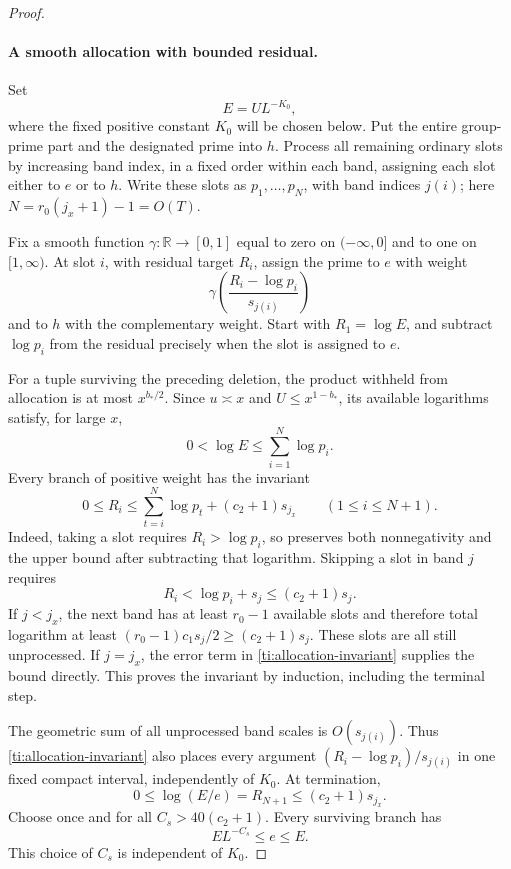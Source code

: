 \begin{proof}
\paragraph{A smooth allocation with bounded residual.}
Set
\begin{equation}\label{ti:E}
                            E=UL^{-K_0},
\end{equation}
where the fixed positive constant $K_0$ will be chosen below. Put the
entire group-prime part and the designated prime into $h$. Process all
remaining ordinary slots by increasing band index, in a fixed order
within each band, assigning each slot either to $e$ or to $h$.
Write these slots as $p_1,\ldots,p_N$, with band indices $j(i)$;
here $N=r_0(j_x+1)-1=O(T)$.

Fix a smooth function $\gamma:\mathbb R\to[0,1]$ equal to zero on
$(-\infty,0]$ and to one on $[1,\infty)$. At slot $i$, with residual
target $R_i$, assign the prime to $e$ with weight
\[
        \gamma\left(\frac{R_i-\log p_i}{s_{j(i)}}\right)
\]
and to $h$ with the complementary weight. Start with
$R_1=\log E$, and subtract $\log p_i$ from the residual precisely
when the slot is assigned to $e$.

For a tuple surviving the preceding deletion, the product withheld
from allocation is at most $x^{b_*/2}$. Since $u\asymp x$ and
$U\le x^{1-b_*}$, its available logarithms satisfy, for large $x$,
\[
 0<\log E\le\sum_{i=1}^N\log p_i.
\]
Every branch of positive weight has the invariant
\begin{equation}\label{ti:allocation-invariant}
 0\le R_i\le\sum_{t=i}^N\log p_t+(c_2+1)s_{j_x}
                    \qquad(1\le i\le N+1).
\end{equation}
Indeed, taking a slot requires $R_i>\log p_i$, so preserves both
nonnegativity and the upper bound after subtracting that logarithm.
Skipping a slot in band $j$ requires
\[
                  R_i<\log p_i+s_j\le(c_2+1)s_j.
\]
If $j<j_x$, the next band has at least $r_0-1$ available slots and
therefore total logarithm at least
$(r_0-1)c_1s_j/2\ge(c_2+1)s_j$. These slots are all still
unprocessed. If $j=j_x$, the error term in
\eqref{ti:allocation-invariant} supplies the bound directly.
This proves the invariant by induction, including the terminal step.

The geometric sum of all unprocessed band scales is
$O(s_{j(i)})$. Thus \eqref{ti:allocation-invariant} also places every
argument $(R_i-\log p_i)/s_{j(i)}$ in one fixed compact interval,
independently of $K_0$. At termination,
\[
       0\le\log(E/e)=R_{N+1}\le(c_2+1)s_{j_x}.
\]
Choose once and for all $C_s>40(c_2+1)$. Every surviving branch has
\begin{equation}\label{ti:e-range}
                         EL^{-C_s}\le e\le E.
\end{equation}
This choice of $C_s$ is independent of $K_0$.


\end{proof}
